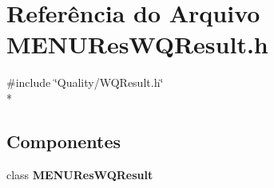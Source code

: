 \section{Referência do Arquivo M\+E\+N\+U\+Res\+W\+Q\+Result.\+h}
\label{_m_e_n_u_res_w_q_result_8h}
{\ttfamily \#include \char`\"{}Quality/\+W\+Q\+Result.\+h\char`\"{}}\\*
\subsection*{Componentes}
\begin{DoxyCompactItemize}
\item 
class {\bf M\+E\+N\+U\+Res\+W\+Q\+Result}
\end{DoxyCompactItemize}

